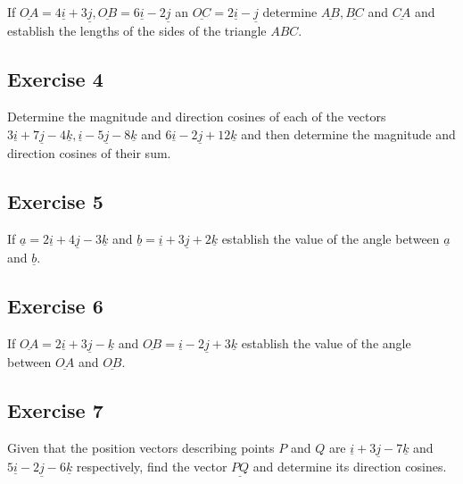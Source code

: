 \documentclass[
  11pt,
  oneside]{book}
\newcommand{\slide}{}
\theoremstyle{definition}
\theoremstyle{definition}
\theoremstyle{definition}
\theoremstyle{definition}
\theoremstyle{remark}
\begin{document}
If \(\underline{OA} = 4\underline{i}+3\underline{j}, \underline{OB}=6\underline{i}-2\underline{j}\) an \(\underline{OC}=2\underline{i}-\underline{j}\) determine \(\underline{AB}, \underline{BC}\) and \(\underline{CA}\) and establish the lengths of the sides of the triangle \(ABC\).

\slide

\subsection*{Exercise 4}\label{exercise-4-9}

Determine the magnitude and direction cosines of each of the vectors \(3\underline{i}+7\underline{j}-4\underline{k}, \underline{i}-5\underline{j}-8\underline{k}\) and \(6\underline{i}-2\underline{j}+12\underline{k}\) and then determine the magnitude and direction cosines of their sum.

\slide

\subsection*{Exercise 5}\label{exercise-5-7}

If \(\underline a=2\underline{i}+4\underline{j}-3\underline{k}\) and \(\underline b=\underline{i}+3\underline{j}+2\underline{k}\) establish the value of the angle between \(\underline a\) and \(\underline b\).

\slide

\subsection*{Exercise 6}\label{exercise-6-5}

If \(\underline{OA}=2\underline{i}+3\underline{j}-\underline{k}\) and \(\underline{OB}=\underline{i}-2\underline{j}+3\underline{k}\) establish the value of the angle between \(\underline{OA}\) and \(\underline{OB}\).

\slide

\subsection*{Exercise 7}\label{exercise-7-2}

Given that the position vectors describing points \(P\) and \(Q\) are \(\underline{i}+3\underline{j}-7\underline{k}\) and \(5\underline{i}-2\underline{j}-6\underline{k}\) respectively, find the vector \(\underline{PQ}\) and determine its direction cosines.
\end{document}
